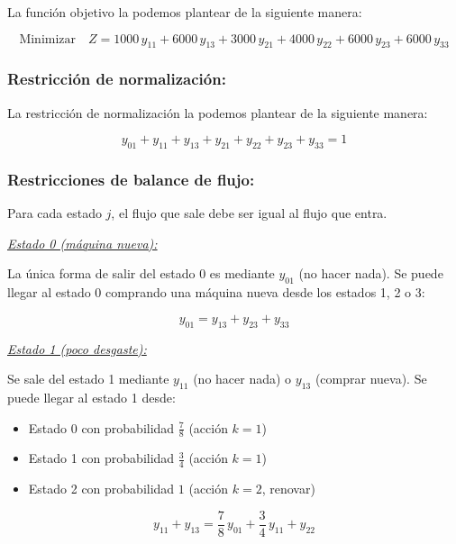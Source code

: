 \documentclass[a4paper,11pt]{article}
\begin{document}
La función objetivo la podemos plantear de la siguiente manera:

\[
\text{Minimizar} \quad Z = 1000\,y_{11} + 6000\,y_{13} + 3000\,y_{21} + 4000\,y_{22} + 6000\,y_{23} + 6000\,y_{33}
\]

\subsubsection{Restricción de normalización:}

La restricción de normalización la podemos plantear de la siguiente manera:

\[
y_{01} + y_{11} + y_{13} + y_{21} + y_{22} + y_{23} + y_{33} = 1
\]

\subsubsection{Restricciones de balance de flujo:}

Para cada estado $j$, el flujo que sale debe ser igual al flujo que entra.

\vspace{0.5em}

\textit{\underline{Estado 0 (máquina nueva):}}

\vspace{0.5em}

La única forma de salir del estado 0 es mediante $y_{01}$ (no hacer nada). Se puede llegar al estado 0 comprando una máquina nueva desde los estados 1, 2 o 3:

\[
y_{01} = y_{13} + y_{23} + y_{33}
\]

\vspace{0.5em}

\textit{\underline{Estado 1 (poco desgaste):}}

\vspace{0.5em}

Se sale del estado 1 mediante $y_{11}$ (no hacer nada) o $y_{13}$ (comprar nueva). Se puede llegar al estado 1 desde:
\begin{itemize}
    \item Estado 0 con probabilidad $\frac{7}{8}$ (acción $k=1$)
    \item Estado 1 con probabilidad $\frac{3}{4}$ (acción $k=1$)
    \item Estado 2 con probabilidad $1$ (acción $k=2$, renovar)
\end{itemize}

\[
y_{11} + y_{13} = \frac{7}{8}\,y_{01} + \frac{3}{4}\,y_{11} + y_{22}
\]
\end{document}
